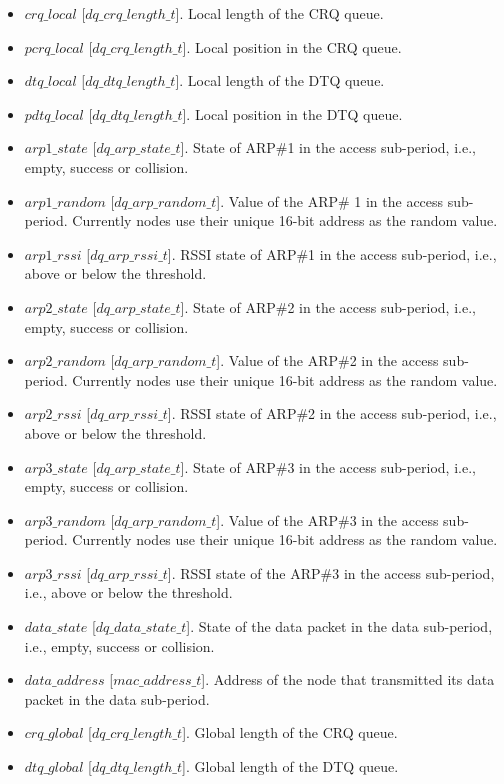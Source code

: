\begin{itemize}
\item $crq\_local$ [$dq\_crq\_length\_t$]. Local length of the CRQ queue.
\item $pcrq\_local$ [$dq\_crq\_length\_t$]. Local position in the CRQ queue.
\item $dtq\_local$ [$dq\_dtq\_length\_t$]. Local length of the DTQ queue.
\item $pdtq\_local$ [$dq\_dtq\_length\_t$]. Local position in the DTQ queue.

\item $arp1\_state$ [$dq\_arp\_state\_t$]. State of ARP\#1 in the access sub-period, i.e., empty, success or collision.
\item $arp1\_random$ [$dq\_arp\_random\_t$]. Value of the ARP\# 1 in the access sub-period. Currently nodes use their unique 16-bit address as the random value.
\item $arp1\_rssi$ [$dq\_arp\_rssi\_t$]. RSSI state of ARP\#1 in the access sub-period, i.e., above or below the threshold.
\item $arp2\_state$ [$dq\_arp\_state\_t$]. State of ARP\#2 in the access sub-period, i.e., empty, success or collision.
\item $arp2\_random$ [$dq\_arp\_random\_t$]. Value of the ARP\#2 in the access sub-period. Currently nodes use their unique 16-bit address as the random value.
\item $arp2\_rssi$ [$dq\_arp\_rssi\_t$]. RSSI state of ARP\#2 in the access sub-period, i.e., above or below the threshold.
\item $arp3\_state$ [$dq\_arp\_state\_t$]. State of ARP\#3 in the access sub-period, i.e., empty, success or collision.
\item $arp3\_random$ [$dq\_arp\_random\_t$]. Value of the ARP\#3 in the access sub-period. Currently nodes use their unique 16-bit address as the random value.
\item $arp3\_rssi$ [$dq\_arp\_rssi\_t$]. RSSI state of the ARP\#3 in the access sub-period, i.e., above or below the threshold.

\item $data\_state$ [$dq\_data\_state\_t$]. State of the data packet in the data sub-period, i.e., empty, success or collision.
\item $data\_address$ [$mac\_address\_t$]. Address of the node that transmitted its data packet in the data sub-period.

\item $crq\_global$ [$dq\_crq\_length\_t$]. Global length of the CRQ queue.
\item $dtq\_global$ [$dq\_dtq\_length\_t$]. Global length of the DTQ queue.
\end{itemize}

